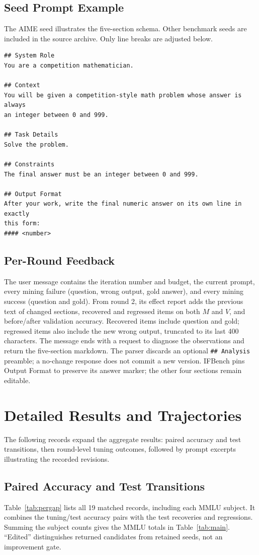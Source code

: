 \documentclass[10pt]{article} %
\begin{document}
\subsection{Seed Prompt Example}
\label{app:seed}
The AIME seed illustrates the five-section schema. Other benchmark seeds are included in the source archive.
Only line breaks are adjusted below.
{\small
\begin{verbatim}
## System Role
You are a competition mathematician.

## Context
You will be given a competition-style math problem whose answer is always
an integer between 0 and 999.

## Task Details
Solve the problem.

## Constraints
The final answer must be an integer between 0 and 999.

## Output Format
After your work, write the final numeric answer on its own line in exactly
this form:
#### <number>
\end{verbatim}
}

\subsection{Per-Round Feedback}
\label{app:feedback}
The user message contains the iteration number and budget, the current prompt, every mining failure (question, wrong
output, gold answer), and every mining success (question and gold). From round 2, its effect report adds the previous
text of changed sections, recovered and regressed items on both $M$ and $V$, and before/after validation accuracy.
Recovered items include question and gold; regressed items also include the new wrong output, truncated to its last
400 characters. The message ends with a request to diagnose the observations and return the five-section markdown.
The parser discards an optional \texttt{\#\# Analysis} preamble; a no-change response does not commit a new version.
IFBench pins Output Format to preserve its answer marker; the other four sections remain editable.

\FloatBarrier
\section{Detailed Results and Trajectories}
\label{app:results}
The following records expand the aggregate results: paired accuracy and test transitions, then round-level tuning
outcomes, followed by prompt excerpts illustrating the recorded revisions.

\subsection{Paired Accuracy and Test Transitions}
\label{app:gap}
Table~\ref{tab:pergap} lists all 19 matched records, including each MMLU subject. It combines the tuning/test
accuracy pairs with the test recoveries and regressions. Summing the subject counts gives the MMLU totals in
Table~\ref{tab:main}. ``Edited'' distinguishes returned candidates from retained seeds, not an improvement gate.
\end{document}
